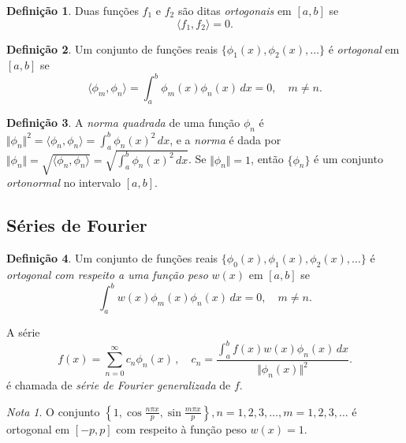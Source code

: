 \documentclass{article}
\theoremstyle{plain}
\theoremstyle{definition}
\newtheorem{defn}{Definição}[section]
\theoremstyle{remark}
\newtheorem*{rem}{Nota}
\begin{document}
\begin{defn}
    Duas funções \(f_1\) e \(f_2\) são ditas \emph{ortogonais} em \([a,b]\) se
    \begin{equation}
        \langle f_1, f_2 \rangle = 0.
    \end{equation}
\end{defn}

\begin{defn}
    Um conjunto de funções reais \(\{\phi_1(x), \phi_2(x), \ldots\}\) é \emph{ortogonal} em \([a,b]\) se
    \begin{equation}
        \langle \phi_m, \phi_n \rangle = \int_a^b \phi_m(x)\phi_n(x) \, dx = 0, \quad m \neq n.
    \end{equation}
\end{defn}

\begin{defn}
    A \emph{norma quadrada} de uma função \(\phi_n\) é \(\Vert \phi _n \Vert^2 = \langle \phi_n, \phi_n \rangle = \int_a^b \phi_n(x)^2 \, dx\), e a \emph{norma} é dada por \(\Vert \phi_n \Vert = \sqrt{\langle \phi_n, \phi_n \rangle} = \sqrt{\int_a^b \phi_n(x)^2 \, dx}\). Se \(\Vert \phi_n \Vert = 1\), então \(\{\phi_n\}\) é um conjunto \emph{ortonormal} no intervalo \([a,b]\).
\end{defn}

\subsection{Séries de Fourier}

\begin{defn}
    Um conjunto de funções reais \(\{\phi_0(x), \phi_1(x), \phi_2(x), \ldots\}\) é \emph{ortogonal com respeito a uma função peso} \(w(x)\) em \([a,b]\) se
    \begin{equation}
        \int_{a}^{b} w(x)\phi_m(x)\phi_n(x) \, dx = 0, \quad m \neq n.
    \end{equation}

    \noindent A série 
    \begin{equation}
    f(x)=\sum_{n=0}^{\infty} c_n \phi_n(x)\,, \quad c_n=\frac{\int_{a}^{b} f(x)w(x)\phi_n(x) \, dx}{\Vert \phi_n(x)\Vert^2}.
    \end{equation}
    \noindent é chamada de \emph{série de Fourier generalizada} de \(f\).
\end{defn}

\begin{rem}
    O conjunto \(\left\{1, \cos\frac{n\pi x}{p}, \sin\frac{m\pi x}{p} \right\}, n=1,2,3,\ldots, m=1,2,3,\ldots\) é ortogonal em \([-p,p]\) com respeito à função peso \(w(x)=1\).
\end{rem}
\end{document}
